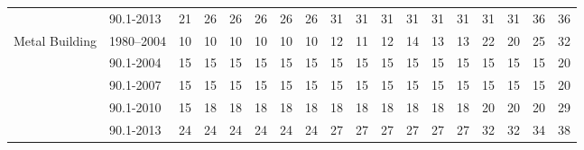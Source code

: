 \begin{table}
\begin{tabular}{p{0.4in}p{0.5in}p{0.1in}p{0.1in}p{0.1in}p{0.1in}p{0.1in}p{0.1in}p{0.1in}p{0.1in}p{0.1in}p{0.1in}p{0.1in}p{0.1in}p{0.1in}p{0.1in}p{0.1in}p{0.1in}}
                & 90.1-2013         & 21 & 26 & 26 & 26 & 26 & 26 & 31 & 31 & 31 & 31 & 31 & 31 & 31 & 31 & 36 & 36  \\
Metal Building  & 1980--2004 & 10 & 10 & 10 & 10 & 10 & 10 & 12 & 11 & 12 & 14 & 13 & 13 & 22 & 20 & 25 & 32  \\
                & 90.1-2004         & 15 & 15 & 15 & 15 & 15 & 15 & 15 & 15 & 15 & 15 & 15 & 15 & 15 & 15 & 15 & 20  \\
                & 90.1-2007         & 15 & 15 & 15 & 15 & 15 & 15 & 15 & 15 & 15 & 15 & 15 & 15 & 15 & 15 & 15 & 20  \\
                & 90.1-2010         & 15 & 18 & 18 & 18 & 18 & 18 & 18 & 18 & 18 & 18 & 18 & 18 & 20 & 20 & 20 & 29  \\
                & 90.1-2013         & 24 & 24 & 24 & 24 & 24 & 24 & 27 & 27 & 27 & 27 & 27 & 27 & 32 & 32 & 34 & 38 
\end{tabular}
\end{table}